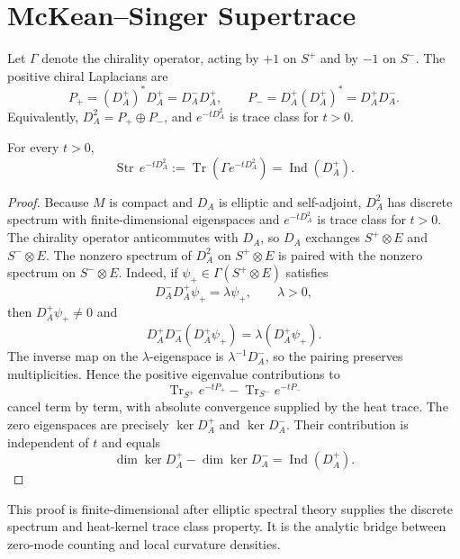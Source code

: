 \section{McKean--Singer Supertrace}

Let \(\Gamma\) denote the chirality operator, acting by \(+1\) on \(S^+\) and
by \(-1\) on \(S^-\).  The positive chiral Laplacians are
\[
  P_+=(D_A^+)^\ast D_A^+=D_A^-D_A^+,
  \qquad
  P_-=D_A^+(D_A^+)^\ast=D_A^+D_A^- .
\]
Equivalently, \(D_A^2=P_+\oplus P_-\), and \(e^{-tD_A^2}\) is trace class for
\(t>0\).

\begin{proposition}
\label{prop:index-mckean-singer}
For every \(t>0\),
\begin{equation}
  \operatorname{Str}\,e^{-tD_A^2}
  :=
  \operatorname{Tr}\!\left(\Gamma e^{-tD_A^2}\right)
  =
  \operatorname{Ind}(D_A^+).
  \label{eq:index-mckean-singer}
\end{equation}
\end{proposition}

\begin{proof}
Because \(M\) is compact and \(D_A\) is elliptic and self-adjoint, \(D_A^2\)
has discrete spectrum with finite-dimensional eigenspaces and
\(e^{-tD_A^2}\) is trace class for \(t>0\).  The chirality operator anticommutes
with \(D_A\), so \(D_A\) exchanges \(S^+\otimes E\) and \(S^-\otimes E\).  The
nonzero spectrum of \(D_A^2\) on \(S^+\otimes E\) is paired with the nonzero
spectrum on \(S^-\otimes E\).  Indeed, if
\(\psi_+\in\Gamma(S^+\otimes E)\) satisfies
\[
  D_A^-D_A^+\psi_+=\lambda\psi_+,\qquad \lambda>0,
\]
then \(D_A^+\psi_+\neq0\) and
\[
  D_A^+D_A^-(D_A^+\psi_+)=\lambda(D_A^+\psi_+).
\]
The inverse map on the \(\lambda\)-eigenspace is \(\lambda^{-1}D_A^-\), so the
pairing preserves multiplicities.  Hence the positive eigenvalue
contributions to
\[
  \operatorname{Tr}_{S^+}e^{-tP_+}
  -
  \operatorname{Tr}_{S^-}e^{-tP_-}
\]
cancel term by term, with absolute convergence supplied by the heat trace.
The zero eigenspaces are precisely \(\ker D_A^+\) and \(\ker D_A^-\).  Their
contribution is independent of \(t\) and equals
\[
  \dim\ker D_A^+-\dim\ker D_A^-=\operatorname{Ind}(D_A^+).
\]
\end{proof}

This proof is finite-dimensional after elliptic spectral theory supplies the
discrete spectrum and heat-kernel trace class property.  It is the analytic
bridge between zero-mode counting and local curvature densities.

